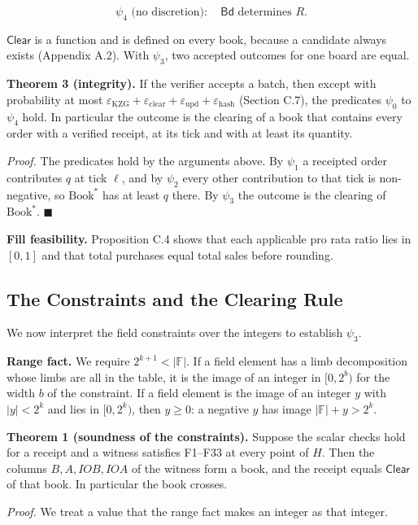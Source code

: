 \[\psi_4 \text{ (no discretion)}:\quad \mathsf{Bd} \text{ determines } R.\]

\(\mathsf{Clear}\) is a function and is defined on every book, because a candidate always exists (Appendix A.2). With \(\psi_3\), two accepted outcomes for one board are equal.

\textbf{Theorem 3 (integrity).} If the verifier accepts a batch, then except with probability at most \(\varepsilon_{\mathrm{KZG}} + \varepsilon_{\mathrm{clear}} + \varepsilon_{\mathrm{upd}} + \varepsilon_{\mathrm{hash}}\) (Section C.7), the predicates \(\psi_0\) to \(\psi_4\) hold. In particular the outcome is the clearing of a book that contains every order with a verified receipt, at its tick and with at least its quantity.

\emph{Proof.} The predicates hold by the arguments above. By \(\psi_1\) a receipted order contributes \(q\) at tick \(\ell\), and by \(\psi_2\) every other contribution to that tick is non-negative, so \(\text{Book}^*\) has at least \(q\) there. By \(\psi_3\) the outcome is the clearing of \(\text{Book}^*\). \(\blacksquare\)

\textbf{Fill feasibility.} Proposition C.4 shows that each applicable pro rata ratio lies in \([0,1]\) and that total purchases equal total sales before rounding.

\subsection{The Constraints and the Clearing Rule}

We now interpret the field constraints over the integers to establish \(\psi_3\).

\textbf{Range fact.} We require \(2^{k+1} < |\mathbb{F}|\). If a field element has a limb decomposition whose limbs are all in the table, it is the image of an integer in \([0, 2^b)\) for the width \(b\) of the constraint. If a field element is the image of an integer \(y\) with \(|y| < 2^k\) and lies in \([0, 2^k)\), then \(y \ge 0\): a negative \(y\) has image \(|\mathbb{F}| + y > 2^k\).

\textbf{Theorem 1 (soundness of the constraints).} Suppose the scalar checks hold for a receipt and a witness satisfies F1--F33 at every point of \(H\). Then the columns \(B, A, IOB, IOA\) of the witness form a book, and the receipt equals \(\mathsf{Clear}\) of that book. In particular the book crosses.

\emph{Proof.} We treat a value that the range fact makes an integer as that integer.

